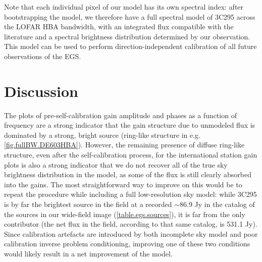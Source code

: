 \pg
Note that each individual pixel of our model has its own spectral index: after bootstrapping the model, we therefore have a full spectral model of 3C295 across the LOFAR HBA bandwidth, with an integrated flux compatible with the literature and a spectral brightness distribution determined by our observation. This model can be used to perform direction-independent calibration of all future observations of the EGS.

\clearpage
\section{Discussion}

\pg
The plots of pre-self-calibration gain amplitude and phases as a function of frequency are a strong indicator that the gain structure due to unmodeled flux is dominated by a strong, bright source (ring-like structure in e.g. \cref{fig.fullBW.DE603HBA}). However, the remaining presence of diffuse ring-like structure, even after the self-calibration process, for the international station gain plots is also a strong indicator that we do not recover all of the true sky brightness distribution in the model, as some of the flux is still clearly absorbed into the gains. The most straightforward way to improve on this would be to repeat the procedure while including a full low-resolution sky model: while 3C295 is by far the brightest source in the field at a recorded $\sim$86.9 Jy in the catalog of the sources in our wide-field image (\cref{table.egs.sources}), it is far from the only contributor (the net flux in the field, according to that same catalog, is 531.1 Jy). Since calibration artefacts are introduced by both incomplete sky model and poor calibration inverse problem conditioning, improving one of these two conditions would likely result in a net improvement of the model. %

